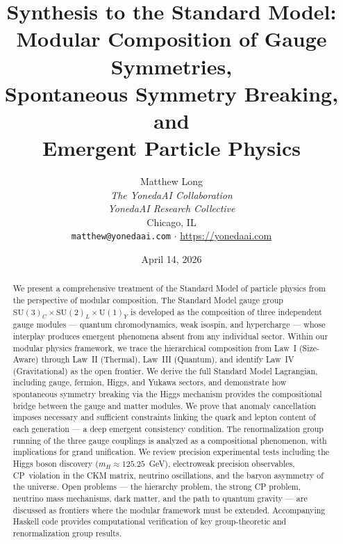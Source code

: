 \documentclass[12pt]{article}
\theoremstyle{definition}
\theoremstyle{remark}
\newcommand{\su}[1]{\mathrm{SU}(#1)}
\newcommand{\uu}[1]{\mathrm{U}(#1)}
\begin{document}
\title{\textbf{Synthesis to the Standard Model: \\[6pt]
Modular Composition of Gauge Symmetries, \\[4pt]
Spontaneous Symmetry Breaking, and \\[4pt]
Emergent Particle Physics}}

\author{Matthew Long \\
\textit{The YonedaAI Collaboration} \\
\textit{YonedaAI Research Collective} \\
Chicago, IL \\
\texttt{matthew@yonedaai.com} $\cdot$ \url{https://yonedaai.com}}

\date{April 14, 2026}

\maketitle

\begin{abstract}
We present a comprehensive treatment of the Standard Model of particle physics from the perspective of modular composition. The Standard Model gauge group $\su{3}_C \times \su{2}_L \times \uu{1}_Y$ is developed as the composition of three independent gauge modules --- quantum chromodynamics, weak isospin, and hypercharge --- whose interplay produces emergent phenomena absent from any individual sector. Within our modular physics framework, we trace the hierarchical composition from Law~I (Size-Aware) through Law~II (Thermal), Law~III (Quantum), and identify Law~IV (Gravitational) as the open frontier. We derive the full Standard Model Lagrangian, including gauge, fermion, Higgs, and Yukawa sectors, and demonstrate how spontaneous symmetry breaking via the Higgs mechanism provides the compositional bridge between the gauge and matter modules. We prove that anomaly cancellation imposes necessary and sufficient constraints linking the quark and lepton content of each generation --- a deep emergent consistency condition. The renormalization group running of the three gauge couplings is analyzed as a compositional phenomenon, with implications for grand unification. We review precision experimental tests including the Higgs boson discovery ($m_H \approx 125.25$~GeV), electroweak precision observables, CP~violation in the CKM matrix, neutrino oscillations, and the baryon asymmetry of the universe. Open problems --- the hierarchy problem, the strong CP problem, neutrino mass mechanisms, dark matter, and the path to quantum gravity --- are discussed as frontiers where the modular framework must be extended. Accompanying Haskell code provides computational verification of key group-theoretic and renormalization group results.
\end{abstract}
\end{document}
